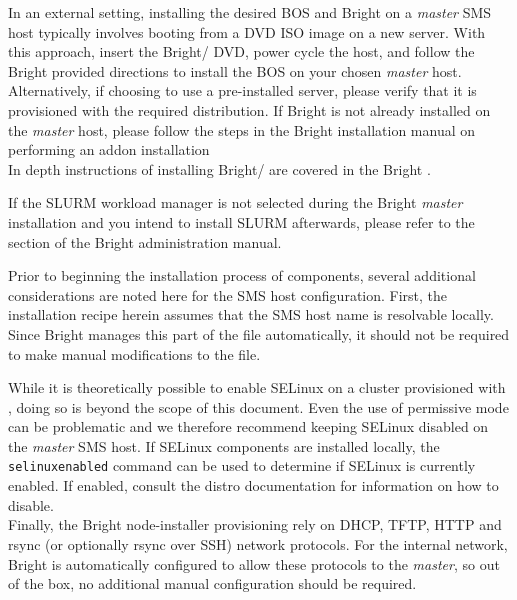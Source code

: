 In an external setting, installing the desired BOS and Bright on a
{\em master} SMS host typically involves booting from a DVD ISO image on a new
server. With this approach, insert the Bright/\baseOS{} DVD, power cycle the host, and
follow the Bright provided directions to install the BOS on your chosen {\em
master} host.  Alternatively, if choosing to use a pre-installed server, please
verify that it is provisioned with the required \baseOS{} distribution. If Bright
is not already installed on the {\em master} host, please follow the steps in the Bright
installation manual on performing an addon installation \\

In depth instructions of installing Bright/\baseOS{} are covered in the Bright 
\href{https://support.brightcomputing.com/manuals/9.0/installation-manual.pdf}{\color{blue}{Installation Manual}}.

If the SLURM workload manager is not selected during the Bright {\em master} installation
and you intend to install SLURM afterwards, please refer to the
\href{https://support.brightcomputing.com/manuals/9.0/admin-manual.pdf#section.7.3}{\color{blue}{Installation of Workload Managers}}
section of the Bright administration manual.

Prior to beginning the installation process of \OHPC{} components, several additional
considerations are noted here for the SMS host configuration. First,
the installation recipe herein assumes that
the SMS host name is resolvable locally. Since Bright manages this part of the
 file automatically, it should not be required to make manual modifications
to the  file.

While it is theoretically possible to enable SELinux on a cluster provisioned
with \provisioner{},
doing so is beyond the scope of this document. Even the use of
permissive mode can be problematic and we therefore recommend keeping SELinux disabled on the {\em
master} SMS host. If SELinux components are installed locally,
the \texttt{selinuxenabled} command can be used to determine if SELinux is
currently enabled. If enabled, consult the distro documentation for information
on how to disable. \\

Finally, the Bright node-installer provisioning rely on DHCP, TFTP, HTTP and rsync
(or optionally rsync over SSH) network protocols. For the internal network, Bright
is automatically configured to allow these protocols to the {\em master}, so out of
the box, no additional manual configuration should be required.

